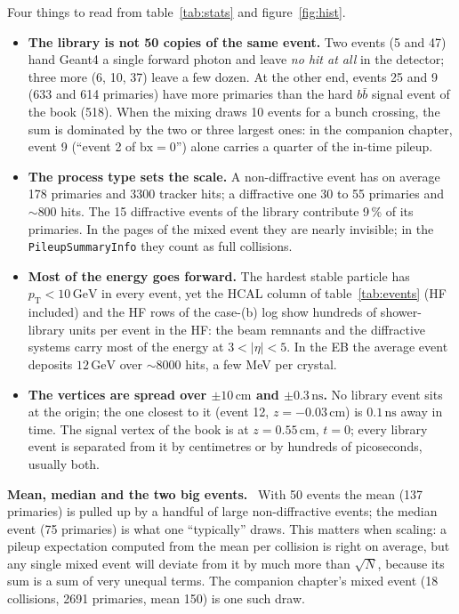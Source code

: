 \documentclass[11pt,a4paper]{article}
\newcommand{\code}[1]{\texttt{#1}}
\newcommand{\pt}{\ensuremath{p_{\mathrm{T}}}}
\newcommand{\bx}{\ensuremath{\mathrm{bx}}}
\newcommand{\bbbar}{\ensuremath{b\bar{b}}}
\newcommand{\GeV}{\,\mathrm{GeV}}
\newcommand{\ns}{\,\mathrm{ns}}
\newcommand{\cm}{\,\mathrm{cm}}
\newenvironment{plainwords}[1][In plain words]{%
  \par\medskip\noindent\setlength{\fboxsep}{6pt}\setlength{\fboxrule}{0.6pt}%
  \begin{lrbox}{\plainbox}\begin{minipage}{\dimexpr\textwidth-2\fboxsep-2\fboxrule\relax}\small
  \textbf{\textcolor{plainrule}{#1.}}\ \ignorespaces}{%
  \end{minipage}\end{lrbox}\noindent\fcolorbox{plainrule}{plainbg}{\usebox{\plainbox}}\par\medskip}
\begin{document}
Four things to read from table~\ref{tab:stats} and figure~\ref{fig:hist}.
\begin{itemize}
\item \textbf{The library is not 50 copies of the same event.} Two events (5 and 47) hand Geant4 a single
  forward photon and leave \emph{no hit at all} in the detector; three more (6, 10, 37) leave a
  few dozen. At the other end, events 25 and 9 (633 and 614 primaries) have more primaries than the hard
  \bbbar{} signal event of the book (518). When the mixing draws 10 events for a bunch crossing, the sum is
  dominated by the two or three largest ones: in the companion chapter, event 9 (``event 2 of $\bx=0$'')
  alone carries a quarter of the in-time pileup.
\item \textbf{The process type sets the scale.} A non-diffractive event has on average 178 primaries and
  3300 tracker hits; a diffractive one 30 to 55 primaries and $\sim800$ hits. The 15 diffractive events of
  the library contribute 9\,\% of its primaries. In the pages of the mixed event they are nearly invisible;
  in the \code{PileupSummaryInfo} they count as full collisions.
\item \textbf{Most of the energy goes forward.} The hardest stable particle has $\pt<10\GeV$ in every event,
  yet the HCAL column of table~\ref{tab:events} (HF included) and the HF rows of the case-(b) log show
  hundreds of shower-library units per event in the HF: the beam remnants and the diffractive systems carry
  most of the energy at $3<|\eta|<5$. In the EB the average event deposits $12\GeV$ over $\sim8000$ hits, a
  few MeV per crystal.
\item \textbf{The vertices are spread over $\pm10\cm$ and $\pm0.3\ns$.} No library event sits at the origin;
  the one closest to it (event 12, $z=-0.03\cm$) is $0.1\ns$ away in time. The signal vertex of the book is
  at $z=0.55\cm$, $t=0$; every library event is separated from it by centimetres or by hundreds of
  picoseconds, usually both.
\end{itemize}

\begin{plainwords}[Mean, median and the two big events]
With 50 events the mean (137 primaries) is pulled up by a handful of large non-diffractive events; the
median event (75 primaries) is what one ``typically'' draws. This matters when scaling: a pileup
expectation computed from the mean per collision is right on average, but any single mixed event will
deviate from it by much more than $\sqrt{N}$, because its sum is a sum of very unequal terms. The
companion chapter's mixed event (18 collisions, 2691 primaries, mean 150) is one such draw.
\end{plainwords}
\end{document}
